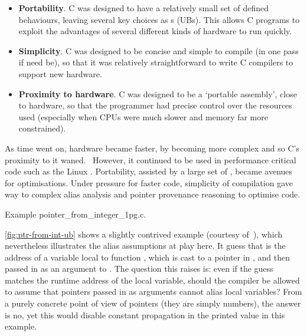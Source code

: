 \begin{itemize}
    \item \textbf{Portability}. C was designed to have a relatively small set
        of defined behaviours, leaving several key choices as
        s (UBs). This allows C programs to
        exploit the advantages of several different kinds of hardware to run
        quickly.
    \item \textbf{Simplicity}. C was designed to be concise and simple to
        compile (in one pass if need be), so that it was relatively
        straightforward to write C compilers to support new hardware.
    \item \textbf{Proximity to hardware}. C was designed to be a `portable
        assembly', close to hardware, so that the programmer had precise
        control over the resources used (especially when CPUs were much slower
        and memory far more constrained).
\end{itemize}

As time went on, hardware became faster, by becoming more complex and so C's
proximity to it waned.~ However, it continued to be
used in performance critical code such as the Linux . Portability,
assisted by a large set of , became avenues for optimisations. Under
pressure for faster code, simplicity of compilation gave way to complex alias
analysis and pointer provenance reasoning to optimise code.

\begin{marginfigure}
    \centering
    \caption{Example pointer\_from\_integer\_1pg.c.}\label{fig:ptr-from-int-ub}
\end{marginfigure}%

\cref{fig:ptr-from-int-ub} shows a slightly contrived example (courtesy
of~), which nevertheless illustrates the
alias assumptions at play here. It guess that  is
the address of a variable local to function , which is
cast to a pointer in , and then passed in as an argument to
. The question this raises is: even if the guess matches the runtime
address of the local variable, should the compiler be allowed to assume that
pointers passed in as arguments cannot alias local variables? From a purely
concrete point of view of pointers (they are simply numbers), the answer is no,
yet this would disable constant propagation in the printed value in this
example.

